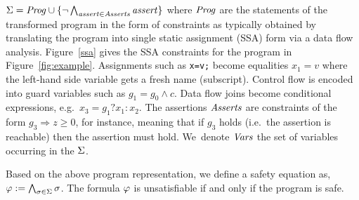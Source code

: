 $\Sigma=\mathit{Prog}\cup\{\neg \bigwedge_{\mathit{assert}\in\mathit{Asserts}} \mathit{assert}\}$
where $\mathit{Prog}$ are the statements of the transformed program in the
form of constraints as typically obtained by translating the program
into single static assignment (SSA) form via a data flow analysis.
%
Figure~\ref{ssa} gives the SSA constraints for the program in
Figure~\ref{fig:example}.
%
Assignments such as \texttt{x=v;} become equalities $x_1=v$ where the
left-hand side variable gets a fresh name (subscript).
%
Control flow is encoded into guard variables such as $g_1=g_0\wedge c$.
%
Data flow joins become conditional expressions, e.g.\ $x_3=g_1?x_1:x_2$.
%
The assertions $\mathit{Asserts}$ are constraints of the form $g_3
\Rightarrow z\geq 0$, for instance, meaning that if $g_3$ holds
(i.e.\ the assertion is reachable) then the assertion must hold.
%
We~denote $\mathit{Vars}$ the set of variables occurring in the $\Sigma$.
%
%

% 

%
Based on the above program representation, we define a safety equation as, 
$\varphi:= \bigwedge_{\sigma\in\Sigma} \sigma$. The formula $\varphi$ is 
unsatisfiable if and only if the program is safe.

